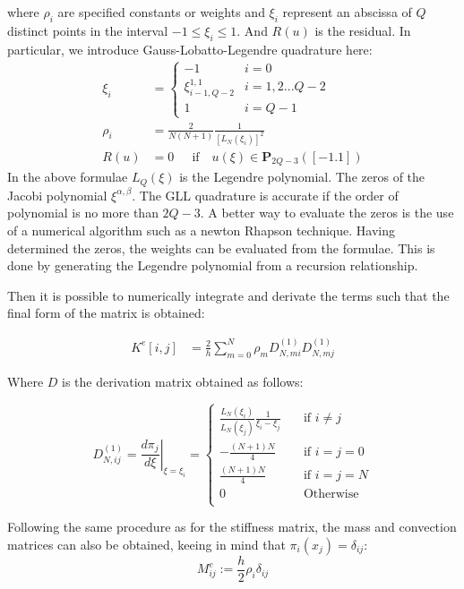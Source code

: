 \documentclass[
  a4paper,
  10pt]{article}
\begin{document}
where \(\rho_i\) are specified constants or weights and \(\xi_i\)
represent an abscissa of \(Q\) distinct points in the interval
\(−1 \leq \xi_i \leq 1\). And \(R(u)\) is the residual. In particular,
we introduce Gauss-Lobatto-Legendre quadrature here: \begin{align}
    \xi_i &= 
    \begin{cases} 
      -1 & i= 0 \\
      \xi_{i-1,Q-2}^{1,1} & i=1,2... Q-2 \\
      1 & i = Q-1 
   \end{cases}\\
   \rho_i&=\frac{2}{N(N+1)}\frac{1}{[L_N(\xi_i)]^2}\\
   R(u) &= 0 ~~~~~\text{ if }~~~ u(\xi)\in\mathbf{P}_{2Q-3}([-1.1])
\end{align} In the above formulae \(L_Q(\xi)\) is the Legendre
polynomial. The zeros of the Jacobi polynomial \(\xi^{\alpha,\beta}\).
The GLL quadrature is accurate if the order of polynomial is no more
than \(2Q-3\). A better way to evaluate the zeros is the use of a
numerical algorithm such as a newton Rhapson technique. Having
determined the zeros, the weights can be evaluated from the formulae.
This is done by generating the Legendre polynomial from a recursion
relationship.

Then it is possible to numerically integrate and derivate the terms such
that the final form of the matrix is obtained:

\begin{align}
K^{e}[i,j]&=\frac{2}{h}\sum_{m=0}^{N} \rho_m D^{(1)}_{N,mi}D^{(1)}_{N,mj} 
\end{align}

Where \(D\) is the derivation matrix obtained as follows:

\begin{equation}
D_{N,ij}^{(1)} = \left. \frac{d\pi_j}{d\xi}\right\rvert_{\xi=\xi_i} =
     \begin{cases}
       \frac{L_N(\xi_i)}{L_N(\xi_j)}\frac{1}{\xi_i-\xi_j} &\quad\text{if }i \neq j \\
       -\frac{(N+1)N}{4} &\quad\text{if }i=j=0 \\
       \frac{(N+1)N}{4} &\quad\text{if }i=j=N \\
       0 &\quad\text{Otherwise } \\
     \end{cases}
\end{equation}

Following the same procedure as for the stiffness matrix, the mass and
convection matrices can also be obtained, keeing in mind that
\(\pi_i(x_j)=\delta_{ij}\): \begin{equation}
     M^{e}_{ij} := \frac{h}{2} \rho_i\delta_{ij} 
\end{equation}
\end{document}

